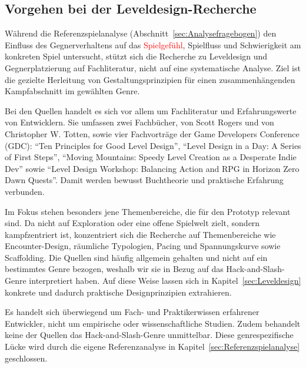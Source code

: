 \documentclass[../Main.tex]{subfiles}
\begin{document}
\subsection{Vorgehen bei der Leveldesign-Recherche} \label{sec:VorgehenLeveldesign}
Während die Referenzspielanalyse (Abschnitt~\ref{sec:Analysefragebogen}) den Einfluss des Gegnerverhaltens auf das \textcolor{red}{Spielgefühl}, Spielfluss und Schwierigkeit am konkreten Spiel untersucht, stützt sich die Recherche zu Leveldesign und Gegnerplatzierung auf Fachliteratur, nicht auf eine systematische Analyse. Ziel ist die gezielte Herleitung von Gestaltungsprinzipien für einen zusammenhängenden Kampfabschnitt im gewählten Genre.

Bei den Quellen handelt es sich vor allem um Fachliteratur und Erfahrungswerte von Entwicklern. Sie umfassen zwei Fachbücher,  von Scott Rogers\autocite{rogers2014levelup} und  von Christopher W. Totten\autocite{totten2014architectural}, sowie vier Fachvorträge der Game Developers Conference (GDC): \enquote{Ten Principles for Good Level Design}\autocite{gdc_tenprinciples2010}, \enquote{Level Design in a Day: A Series of First Steps}\autocite{gdc_leveldesignaday2020}, \enquote{Moving Mountains: Speedy Level Creation as a Desperate Indie Dev}\autocite{gdc_movingmountains2020} sowie \enquote{Level Design Workshop: Balancing Action and RPG in Horizon Zero Dawn Quests}\autocite{gdc_horizonquests2018}. Damit werden bewusst Buchtheorie und praktische Erfahrung verbunden.

Im Fokus stehen besonders jene Themenbereiche, die für den Prototyp relevant sind. Da  nicht auf Exploration oder eine offene Spielwelt zielt, sondern kampfzentriert ist, konzentriert sich die Recherche auf Themenbereiche wie Encounter-Design, räumliche Typologien, Pacing und Spannungskurve sowie Scaffolding. Die Quellen sind häufig allgemein gehalten und nicht auf ein bestimmtes Genre bezogen, weshalb wir sie in Bezug auf das Hack-and-Slash-Genre interpretiert haben. Auf diese Weise lassen sich in Kapitel~\ref{sec:Leveldesign} konkrete und dadurch praktische Designprinzipien extrahieren.

Es handelt sich überwiegend um Fach- und Praktikerwissen erfahrener Entwickler, nicht um empirische oder wissenschaftliche Studien. Zudem behandelt keine der Quellen das Hack-and-Slash-Genre unmittelbar. Diese genrespezifische Lücke wird durch die eigene Referenzanalyse in Kapitel~\ref{sec:Referenzspielanalyse} geschlossen.
\end{document}
